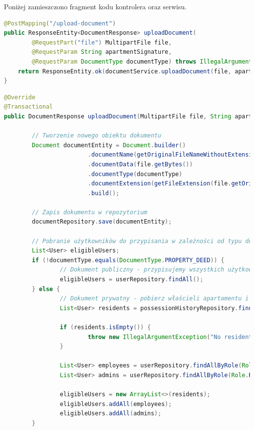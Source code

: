 Poniżej zamieszczono fragment kodu kontrolera oraz serwisu.
\begin{lstlisting}[language=Java, style=JavaStyle, caption=Fragment klasy \texttt{DocumentController}]
@PostMapping("/upload-document")
public ResponseEntity<DocumentResponse> uploadDocument(
        @RequestPart("file") MultipartFile file,
        @RequestParam String apartmentSignature,
        @RequestParam DocumentType documentType) throws IllegalArgumentException, IOException {
    return ResponseEntity.ok(documentService.uploadDocument(file, apartmentSignature, documentType));
}
\end{lstlisting}

\begin{lstlisting}[language=Java, style=JavaStyle, caption=Metoda dodawania dokumentu w klasie \texttt{DocumentServiceImp}]
@Override
@Transactional
public DocumentResponse uploadDocument(MultipartFile file, String apartmentSignature, DocumentType documentType) throws IllegalArgumentException, IOException {

		// Tworzenie nowego obiektu dokumentu
		Document documentEntity = Document.builder()
						.documentName(getOriginalFileNameWithoutExtension(file.getOriginalFilename()))
						.documentData(file.getBytes())
						.documentType(documentType)
						.documentExtension(getFileExtension(file.getOriginalFilename()))
						.build();

		// Zapis dokumentu w repozytorium
		documentRepository.save(documentEntity);

		// Pobranie użytkowników do przypisania w zależności od typu dokumentu
		List<User> eligibleUsers;
		if (!documentType.equals(DocumentType.PROPERTY_DEED)) {
				// Dokument publiczny - przypisujemy wszystkich użytkowników
				eligibleUsers = userRepository.findAll();
		} else {
				// Dokument prywatny - pobierz właścieli apartamentu i pracowników oraz adminów
				List<User> residents = possessionHistoryRepository.findActiveResidentsByApartment(apartmentSignature);

				if (residents.isEmpty()) {
						throw new IllegalArgumentException("No residents found in apartment with signature: " + apartmentSignature);
				}

				List<User> employees = userRepository.findAllByRole(Role.ROLE_EMPLOYEE);
				List<User> admins = userRepository.findAllByRole(Role.ROLE_ADMIN);

				eligibleUsers = new ArrayList<>(residents);
				eligibleUsers.addAll(employees);
				eligibleUsers.addAll(admins);
		}


\end{lstlisting}
